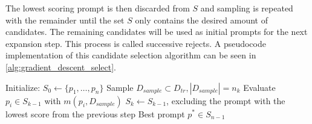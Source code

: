 The lowest scoring prompt is then discarded from $S$ and sampling is repeated with the remainder until the set $S$ only contains the desired amount of candidates. The remaining candidates will be used as initial prompts for the next expansion step. This process is called successive rejects. A pseudocode implementation of this candidate selection algorithm can be seen in \autoref{alg:gradient_descent_select}.


\begin{algorithm}
\caption{}
\label{alg:gradient_descent_select}
\begin{algorithmic}[1]
    \State Initialize: $S_0 \gets \{p_1, \dots , p_n\}$
        \State Sample $D_{sample} \subset D_{tr}, |D_{sample}| = n_k$
        \State Evaluate $p_i \in S_{k-1}$ with $m(p_i, D_{sample})$
        \State $S_k \gets S_{k-1}$, excluding the prompt with the lowest score from the previous step
    \EndFor
    \State \Return Best prompt $p^* \in S_{n-1}$
\end{algorithmic}
\end{algorithm}
